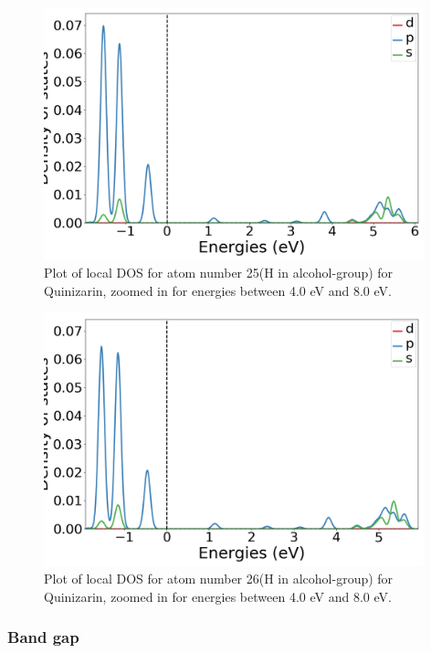 \documentclass{article}
\begin{document}
      \begin{figure}[H]
        \centering
        \includegraphics[width = 11cm]{../fig/basic_LDOS25_2.png}
        \caption{Plot of local DOS for atom number 25(H in alcohol-group) for Quinizarin, zoomed in for energies between 4.0 eV and 8.0 eV. }
        \label{fig:basic_LDOS25_2}
      \end{figure}

      \begin{figure}[H]
        \centering
        \includegraphics[width = 11cm]{../fig/basic_LDOS26_2.png}
        \caption{Plot of local DOS for atom number 26(H in alcohol-group) for Quinizarin, zoomed in for energies between 4.0 eV and 8.0 eV. }
        \label{fig:basic_LDOS26_2}
      \end{figure}

    \subsubsection{Band gap}
\end{document}
